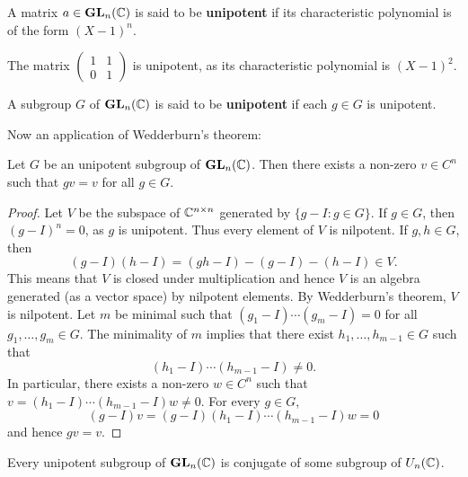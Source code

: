 \begin{definition}
    A matrix $a\in\mathbf{GL}_n(\mathbb{C})$ is said to be \textbf{unipotent} 
    if its characteristic polynomial is of the form 
    $(X-1)^n$. 
\end{definition}

The matrix $\begin{pmatrix}1&1\\0&1\end{pmatrix}$ is unipotent, 
as its characteristic polynomial is $(X-1)^2$. 

\begin{definition}
    A subgroup $G$ of $\mathbf{GL}_n(\mathbb{C})$ is said to be \textbf{unipotent} if
    each $g\in G$ is unipotent. 
\end{definition}

Now an application of Wedderburn's theorem:

\begin{proposition}
\label{pro:unipotent}
    Let $G$ be an unipotent subgroup of $\mathbf{GL}_n(\mathbb{C})$. 
    Then there exists a non-zero 
    $v\in C^{n}$ such that $gv=v$ for all $g\in G$. 
\end{proposition}

\begin{proof}
    Let $V$ be the subspace of $\mathbb{C}^{n\times n}$ 
    generated by $\{g-I:g\in G\}$. If $g\in G$, then 
    $(g-I)^n=0$, as $g$ is unipotent. Thus
    every element of $V$ is nilpotent. If $g,h\in G$, 
    then 
    \[
    (g-I)(h-I)=(gh-I)-(g-I)-(h-I)\in V.
    \]
    This means that $V$ is closed under multiplication and
    hence $V$ is an algebra generated (as a vector space)
    by nilpotent elements. By Wedderburn's theorem, 
    $V$ is nilpotent. Let $m$ be minimal 
    such that 
    $(g_1-I)\cdots (g_m-I)=0$ 
    for all $g_1,\dots,g_m\in G$. The minimality of $m$ implies that  
    there exist $h_1,\dots,h_{m-1}\in G$ such that 
    \[
    (h_1-I)\cdots (h_{m-1}-I)\ne 0.
    \]
    In particular, there exists a non-zero 
    $w\in C^{n}$ such that 
    $v=(h_1-I)\cdots (h_{m-1}-I)w\ne 0$. For every 
    $g\in G$, 
    \[
    (g-I)v=(g-I)(h_1-I)\cdots (h_{m-1}-I)w=0
    \]
    and hence $gv=v$. 
\end{proof}

\begin{theorem}[Kolchin]
\label{thm:Kolchin}
Every unipotent subgroup of $\mathbf{GL}_n(\mathbb{C})$ is conjugate
of some subgroup of $U_n(\mathbb{C})$. 
\end{theorem}


